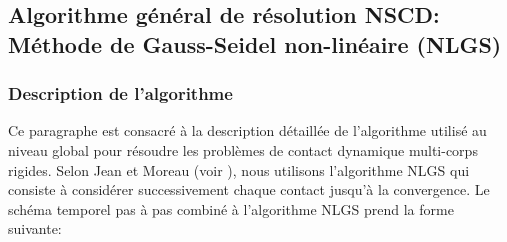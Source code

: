 \subsection{Algorithme général de résolution NSCD: Méthode de Gauss-Seidel non-linéaire (NLGS)}\label{NLGS}

\subsubsection{Description de l'algorithme}\label{NSCD_algo}

Ce paragraphe est consacré à la description détaillée de l'algorithme utilisé au niveau global pour résoudre les problèmes de contact dynamique multi-corps rigides. Selon Jean et Moreau (voir \cite{jean1999non, jourdan1998gauss, moreau1988unilateral}), nous utilisons l'algorithme NLGS qui consiste à considérer successivement chaque contact jusqu'à la convergence. Le schéma temporel pas à pas combiné à l'algorithme NLGS prend la forme suivante:

